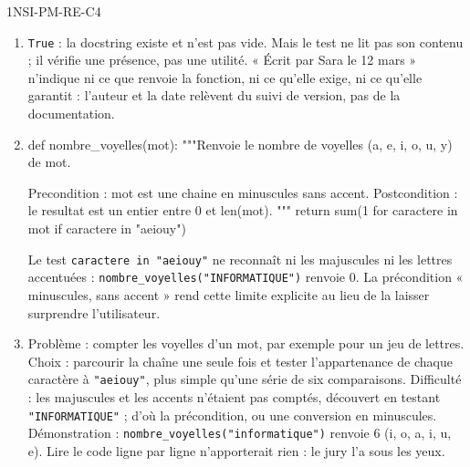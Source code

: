 \begin{corrige}{1NSI-PM-RE-C4}
\begin{enumerate}
  \item \lstinline{True} : la docstring existe et n'est pas vide. Mais le test ne lit pas son
        contenu ; il vérifie une présence, pas une utilité. « Écrit par Sara le 12 mars »
        n'indique ni ce que renvoie la fonction, ni ce qu'elle exige, ni ce qu'elle garantit :
        l'auteur et la date relèvent du suivi de version, pas de la documentation.
  \item
\begin{python}
def nombre_voyelles(mot):
    """Renvoie le nombre de voyelles (a, e, i, o, u, y) de mot.

    Precondition : mot est une chaine en minuscules sans accent.
    Postcondition : le resultat est un entier entre 0 et len(mot).
    """
    return sum(1 for caractere in mot if caractere in "aeiouy")
\end{python}
        Le test \lstinline{caractere in "aeiouy"} ne reconnaît ni les majuscules ni les
        lettres accentuées : \lstinline{nombre_voyelles("INFORMATIQUE")} renvoie $0$. La
        précondition « minuscules, sans accent » rend cette limite explicite au lieu de la
        laisser surprendre l'utilisateur.
  \item Problème : compter les voyelles d'un mot, par exemple pour un jeu de lettres. Choix :
        parcourir la chaîne une seule fois et tester l'appartenance de chaque caractère à
        \lstinline{"aeiouy"}, plus simple qu'une série de six comparaisons. Difficulté : les
        majuscules et les accents n'étaient pas comptés, découvert en testant
        \lstinline{"INFORMATIQUE"} ; d'où la précondition, ou une conversion en minuscules.
        Démonstration : \lstinline{nombre_voyelles("informatique")} renvoie $6$ (i, o, a, i,
        u, e). Lire le code ligne par ligne n'apporterait rien : le jury l'a sous les yeux.
\end{enumerate}
\end{corrige}
